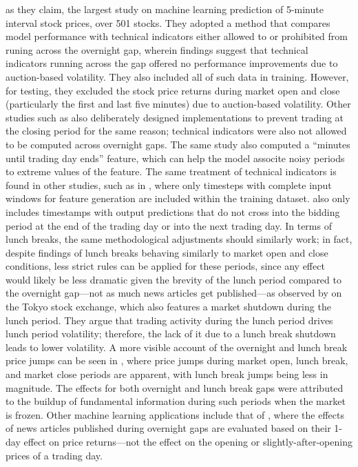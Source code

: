 \documentclass[stu,floatsintext]{apa7}
\begin{document}
as they claim, the largest study on machine learning prediction of 5-minute interval stock prices, over 501 stocks. They adopted a method that compares model performance with technical indicators either allowed to or prohibited from runing across the overnight gap, wherein findings suggest that technical indicators running across the gap offered no performance improvements due to auction-based volatility. They also included all of such data in training. However, for testing, they excluded the stock price returns during market open and close (particularly the first and last five minutes) due to auction-based volatility. Other studies such as \parencite{goluza2024deep} also deliberately designed implementations to prevent trading at the closing period for the same reason; technical indicators were also not allowed to be computed across overnight gaps. The same study also computed a ``minutes until trading day ends'' feature, which can help the model associte noisy periods to extreme values of the feature. The same treatment of technical indicators is found in other studies, such as in \parencite{son2012forecasting}, where only timesteps with complete input windows for feature generation are included within the training dataset. \textcite{son2012forecasting} also only includes timestamps with output predictions that do not cross into the bidding period at the end of the trading day or into the next trading day. In terms of lunch breaks, the same methodological adjustments should similarly work; in fact, despite findings of lunch breaks behaving similarly to market open and close conditions, less strict rules can be applied for these periods, since any effect would likely be less dramatic given the brevity of the lunch period compared to the overnight gap—not as much news articles get published—as observed by \textcite{ito1992lunch} on the Tokyo stock exchange, which also features a market shutdown during the lunch period. They argue that trading activity during the lunch period drives lunch period volatility; therefore, the lack of it due to a lunch break shutdown leads to lower volatility. A more visible account of the overnight and lunch break price jumps can be seen in \textcite{kong2020predicting}, where price jumps during market open, lunch break, and market close periods are apparent, with lunch break jumps being less in magnitude. The effects for both overnight and lunch break gaps were attributed to the buildup of fundamental information during such periods when the market is frozen. Other machine learning applications include that of \textcite{chen2021stock}, where the effects of news articles published during overnight gaps are evaluated based on their 1-day effect on price returns—not the effect on the opening or slightly-after-opening prices of a trading day.
\end{document}
